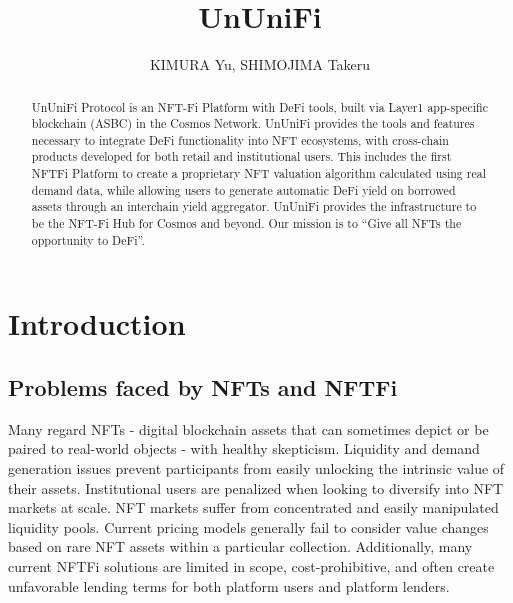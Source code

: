 \documentclass[dvipdfmx]{jsarticle}
\title{UnUniFi}
\author{KIMURA Yu, SHIMOJIMA Takeru}
\begin{document}

\maketitle

\begin{abstract}
  UnUniFi Protocol is an NFT-Fi Platform with DeFi tools, built via Layer1 app-specific blockchain (ASBC) in the Cosmos Network. 
  UnUniFi provides the tools and features necessary to integrate DeFi functionality into NFT ecosystems, with cross-chain products developed for both retail and institutional users. 
  This includes the first NFTFi Platform to create a proprietary NFT valuation algorithm calculated using real demand data, while allowing users to generate automatic DeFi yield on borrowed assets through an interchain yield aggregator. 
  UnUniFi provides the infrastructure to be the NFT-Fi Hub for Cosmos and beyond. 
  Our mission is to “Give all NFTs the opportunity to DeFi”.
\end{abstract}

\section{Introduction}

\subsection{Problems faced by NFTs and NFTFi}
Many regard NFTs - digital blockchain assets that can sometimes depict or be paired to real-world objects - with healthy skepticism. 
Liquidity and demand generation issues prevent participants from easily unlocking the intrinsic value of their assets. 
Institutional users are penalized when looking to diversify into NFT markets at scale. 
NFT markets suffer from concentrated and easily manipulated liquidity pools. 
Current pricing models generally fail to consider value changes based on rare NFT assets within a particular collection. 
Additionally, many current NFTFi solutions are limited in scope, cost-prohibitive, and often create unfavorable lending terms for both platform users and platform lenders.
\end{document}
